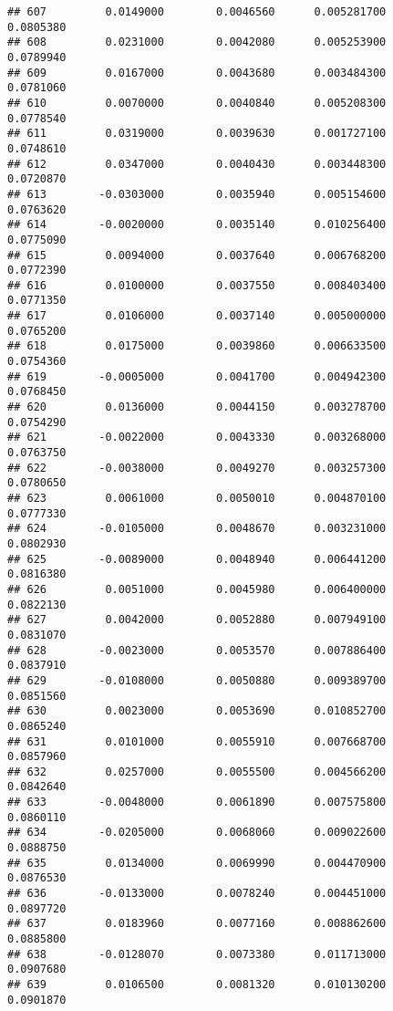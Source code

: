 \documentclass[
]{article}
\begin{document}
\begin{verbatim}
## 607         0.0149000        0.0046560      0.005281700             0.0805380
## 608         0.0231000        0.0042080      0.005253900             0.0789940
## 609         0.0167000        0.0043680      0.003484300             0.0781060
## 610         0.0070000        0.0040840      0.005208300             0.0778540
## 611         0.0319000        0.0039630      0.001727100             0.0748610
## 612         0.0347000        0.0040430      0.003448300             0.0720870
## 613        -0.0303000        0.0035940      0.005154600             0.0763620
## 614        -0.0020000        0.0035140      0.010256400             0.0775090
## 615         0.0094000        0.0037640      0.006768200             0.0772390
## 616         0.0100000        0.0037550      0.008403400             0.0771350
## 617         0.0106000        0.0037140      0.005000000             0.0765200
## 618         0.0175000        0.0039860      0.006633500             0.0754360
## 619        -0.0005000        0.0041700      0.004942300             0.0768450
## 620         0.0136000        0.0044150      0.003278700             0.0754290
## 621        -0.0022000        0.0043330      0.003268000             0.0763750
## 622        -0.0038000        0.0049270      0.003257300             0.0780650
## 623         0.0061000        0.0050010      0.004870100             0.0777330
## 624        -0.0105000        0.0048670      0.003231000             0.0802930
## 625        -0.0089000        0.0048940      0.006441200             0.0816380
## 626         0.0051000        0.0045980      0.006400000             0.0822130
## 627         0.0042000        0.0052880      0.007949100             0.0831070
## 628        -0.0023000        0.0053570      0.007886400             0.0837910
## 629        -0.0108000        0.0050880      0.009389700             0.0851560
## 630         0.0023000        0.0053690      0.010852700             0.0865240
## 631         0.0101000        0.0055910      0.007668700             0.0857960
## 632         0.0257000        0.0055500      0.004566200             0.0842640
## 633        -0.0048000        0.0061890      0.007575800             0.0860110
## 634        -0.0205000        0.0068060      0.009022600             0.0888750
## 635         0.0134000        0.0069990      0.004470900             0.0876530
## 636        -0.0133000        0.0078240      0.004451000             0.0897720
## 637         0.0183960        0.0077160      0.008862600             0.0885800
## 638        -0.0128070        0.0073380      0.011713000             0.0907680
## 639         0.0106500        0.0081320      0.010130200             0.0901870

\end{verbatim}
\end{document}
